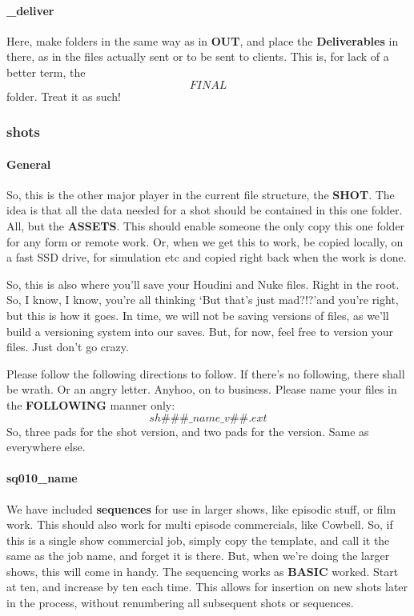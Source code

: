 \paragraph{\_deliver}
Here, make folders in the same way as in \textbf{OUT}, and place the \textbf{Deliverables} in there, as in the files actually sent or to be sent to clients. This is, for lack of a better term, the \textbf{\texttt{\[FINAL\]}} folder. Treat it as such!

\subsubsection{shots}
\paragraph{General}
So, this is the other major player in the current file structure, the \textbf{SHOT}. The idea is that all the data needed for a shot should be contained in this one folder. All, but the \textbf{ASSETS}. This should enable someone the only copy this one folder for any form or remote work. Or, when we get this to work, be copied locally, on a fast SSD drive, for simulation etc and copied right back when the work is done. 

So, this is also where you'll save your Houdini and Nuke files. Right in the root. So, I know, I know, you're all thinking \lq But that's just mad?!?\rq and you're right, but this is how it goes. In time, we will not be saving versions of files, as we'll build a versioning system into our saves. But, for now, feel free to version your files. Just don't go crazy.  

Please follow the following directions to follow. If there's no following, there shall be wrath. Or an angry letter. Anyhoo, on to business. Please name your files in the \textbf{FOLLOWING} manner only:
\texttt{\textbf{\[sh\#\#\#\_name\_v\#\#.ext\]}}
So, three pads for the shot version, and two pads for the version. Same as everywhere else. 

\paragraph{sq010\_name}
We have included \textbf{sequences} for use in larger shows, like episodic stuff, or film work. This should also work for multi episode commercials, like Cowbell. So, if this is a single show commercial job, simply copy the template, and call it the same as the job name, and forget it is there. But, when we're doing the larger shows, this will come in handy. The sequencing works as \textbf{BASIC} worked. Start at ten, and increase by ten each time. This allows for insertion on new shots later in the process, without renumbering all subsequent shots or sequences.  

